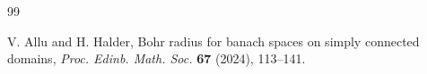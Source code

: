 \documentclass[a4paper,11pt, reqno]{amsart}
\theoremstyle{definition}
\begin{document}
\begin{thebibliography}{99}
	
	
	
	
	
	 {\sc V. Allu } and {\sc H. Halder}, Bohr radius for banach spaces on simply connected domains, {\it Proc. Edinb. Math. Soc.} {\bf 67} (2024), 113--141.
	
	
	
	
	
	
	
	
	

\end{thebibliography}
\end{document}
